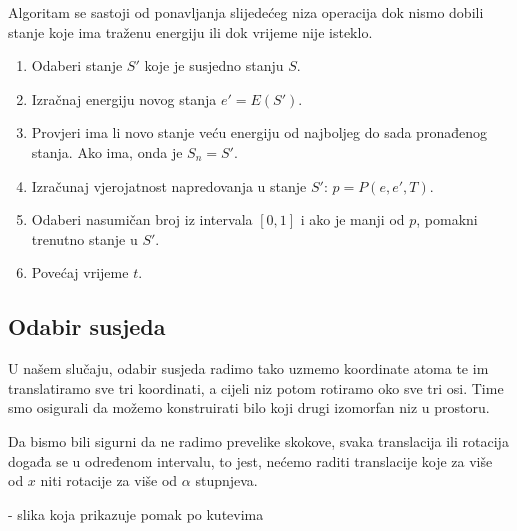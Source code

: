\documentclass[times, utf8, zavrsni]{fer}
\begin{document}
Algoritam se sastoji od ponavljanja slijedećeg niza operacija
dok nismo dobili stanje koje ima traženu energiju ili dok vrijeme nije isteklo.

\begin{enumerate}
\item
Odaberi stanje $S'$ koje je susjedno stanju $S$. 

\item
Izračnaj energiju novog stanja $e' = E(S')$. 

\item 
Provjeri ima li novo stanje veću energiju od najboljeg do sada pronađenog stanja.
Ako ima, onda je $S_n = S'$.

\item
Izračunaj vjerojatnost napredovanja u stanje $S'$: $p = P(e, e', T)$. 

\item
Odaberi nasumičan broj iz intervala $[0, 1]$ i ako je manji od $p$, 
pomakni trenutno stanje u $S'$. 

\item 
Povećaj vrijeme $t$. 

\end{enumerate}

\subsection{Odabir susjeda}
U našem slučaju, odabir susjeda radimo tako uzmemo koordinate atoma te
im translatiramo sve tri koordinati, a cijeli niz potom rotiramo oko sve tri
osi. Time smo osigurali da možemo konstruirati bilo koji drugi izomorfan niz u
prostoru.

Da bismo bili sigurni da ne radimo prevelike skokove, svaka translacija
ili rotacija događa se u određenom intervalu, to jest,
nećemo raditi translacije koje za više od $x$ niti rotacije za više od
$\alpha$ stupnjeva.

- slika koja prikazuje pomak po kutevima

\end{document}

